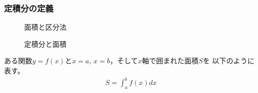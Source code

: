 \documentclass[twocolumn,11pt]{jarticle}
\begin{document}
\subsubsection{定積分の定義}
\begin{figure}[h]
  \begin{center}
    \caption{\label{fig:SbySum}
      面積と区分法}
  \end{center}
\end{figure}
\begin{figure}[h]
  \begin{center}
    \caption{\label{fig:integration}
      定積分と面積}
  \end{center}
\end{figure}


ある関数$y=f(x)$と$x=a$, $x=b$，そして$x$軸で囲まれた面積$S$を
以下のように表す。
\begin{align}
  \label{eq:integration}
  S=\int_a^bf(x)dx
\end{align}
\end{document}
